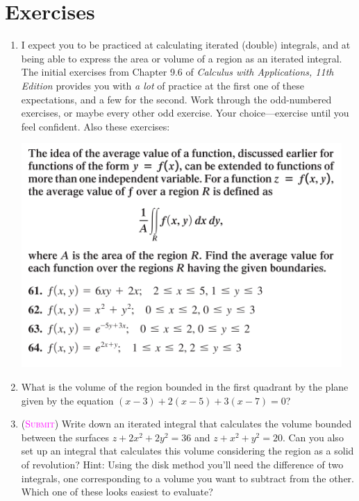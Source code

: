 \newpage

\section*{Exercises}

\begin{enumerate}
    \item %
        I expect you to be practiced at calculating 
        iterated (double) integrals, 
        and at being able to express the area or volume of a region
        as an iterated integral. 
        The initial exercises from Chapter 9.6 of 
        \emph{Calculus with Applications, 11th Edition}
        provides you with \emph{a lot} of practice at the first
        one of these expectations, and a few for the second.
        Work through the odd-numbered exercises, or maybe every other odd exercise.
        Your choice---exercise until you feel confident.
        Also these exercises:
        \begin{center}
            \includegraphics[width=0.96\textwidth]{screenshots/61626364.png}
        \end{center}

    \item 
        What is the volume of the region bounded in the first quadrant 
        by the plane given by the equation $(x-3) + 2(x-5) + 3(x-7) = 0$?

    \item 
        (\textsc{\textcolor{magenta}{Submit}})
        Write down an iterated integral that calculates the volume
        bounded between the surfaces
        $z + 2x^2+2y^2=36$ and $z+x^2+y^2=20$.
        Can you also set up an integral that calculates this volume
        considering the region as a solid of revolution?
        Hint: Using the disk method you'll need 
        the difference of two integrals, one corresponding to a volume
        you want to subtract from the other.
        Which one of these looks easiest to evaluate?


\end{enumerate}
